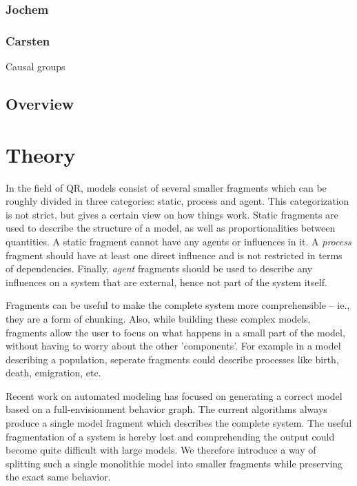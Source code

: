 \documentclass{article}
\begin{document}

\subsubsection{Jochem}

\subsubsection{Carsten}
Causal groups %

\subsection{Overview}

\section{Theory}

In the field of QR, models %
consist of
several smaller fragments which can be roughly divided in three categories:
static, process and agent. This categorization is not strict, but gives
a certain view on how things work. Static fragments are used to describe the
structure of a model, as well as proportionalities between quantities. A static
fragment cannot have any agents or influences in it. A \emph{process} fragment
should have at least one direct influence and is not restricted in terms of dependencies. %
Finally, \emph{agent} fragments should be used to describe any influences on a
system that are external, hence not part of the system itself.

Fragments can be useful to make the complete system more comprehensible -- ie., they are a form of chunking. 
Also, while building these complex models, fragments allow the user to focus on
what happens in a small part of the model, without having to worry about the
other 'components'. For example in a model describing a population, seperate
fragments could describe processes like birth, death, emigration, etc.

Recent work on automated modeling \cite{buisman, liem, vanweelden} has focused
on generating a correct model based on a full-envisionment behavior graph. The
current algorithms always produce a single model fragment which describes the
complete system. The useful fragmentation of a system is hereby lost and
comprehending the output could become quite difficult with large models. We
therefore introduce a way of splitting such a single monolithic model into
smaller fragments while preserving the exact same behavior.
\end{document}
